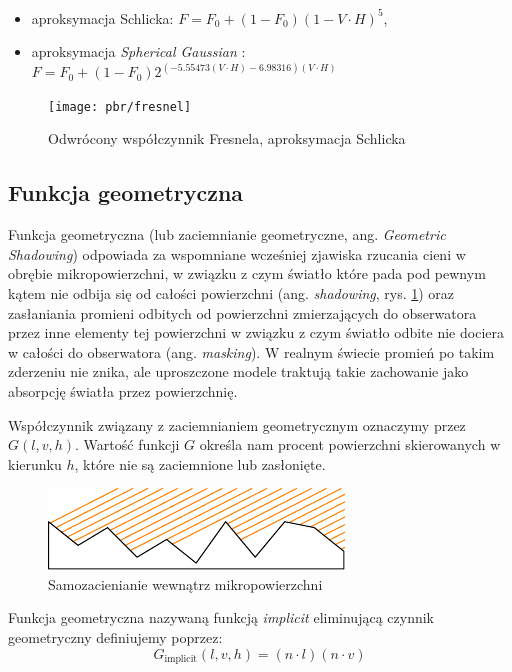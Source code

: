 \documentclass[../main.tex]{subfiles}
\begin{document}
\begin{itemize}
\item aproksymacja Schlicka: $F = F_0 + (1 - F_0)(1-V \cdot H)^5$,
\item aproksymacja \textit{Spherical Gaussian} \cite{SphericalGaussianLegarde}:
  $ F = F_0 +(1−F_0) 2^{
    \left(−5.55473\left(V \cdot H\right)−6.98316\right) (V \cdot H)
  } $
\end{itemize}

\begin{figure}[ht]
  \centering
  \texttt{[image: pbr/fresnel]}
  \caption{Odwrócony współczynnik Fresnela, aproksymacja Schlicka}
\end{figure}

\subsection{Funkcja geometryczna}

Funkcja geometryczna (lub zaciemnianie geometryczne, ang. \textit{Geometric
Shadowing}) odpowiada za wspomniane wcześniej zjawiska rzucania cieni w obrębie
mikropowierzchni, w związku z czym światło które pada pod pewnym kątem nie
odbija się od całości powierzchni (ang. \textit{shadowing}, rys.
\ref{fig:GeometricShadowing}) oraz zasłaniania promieni odbitych od powierzchni
zmierzających do obserwatora przez inne elementy tej powierzchni w związku z
czym światło odbite nie dociera w całości do obserwatora (ang.
\textit{masking}). W realnym świecie promień po takim zderzeniu nie znika, ale
uproszczone modele traktują takie zachowanie jako absorpcję światła przez
powierzchnię.

Współczynnik związany z zaciemnianiem geometrycznym oznaczymy przez $G(l,v,h)$.
Wartość funkcji $G$ określa nam procent powierzchni skierowanych w kierunku
$h$, które nie są zaciemnione lub zasłonięte.

\begin{figure}[h]
  \centering
  \includegraphics{illustrations/pbr/geometry_shadowing.pdf}
  \vspace{0.25cm}
  \caption{Samozacienianie wewnątrz mikropowierzchni}
  \label{fig:GeometricShadowing}
\end{figure}

Funkcja geometryczna nazywaną funkcją \textit{implicit} eliminującą czynnik
geometryczny definiujemy poprzez:
\[
  G_{\text{implicit}}(l,v,h) =
    (n \cdot l) (n \cdot v)
\]
\end{document}

